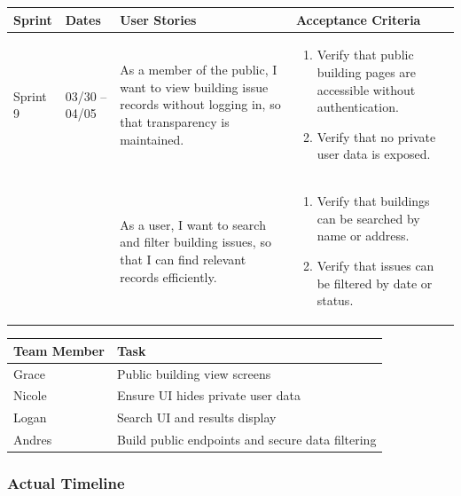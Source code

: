\documentclass[12pt]{article}
\begin{document}
\noindent
\begin{tabular}{|L{1.2cm}|L{1.8cm}|L{5.2cm}|L{6.3cm}|}
\hline
\textbf{Sprint} & \textbf{Dates} & \textbf{User Stories} & \textbf{Acceptance Criteria} \\
\hline
Sprint 9 & 03/30 -- 04/05 &
As a member of the public, I want to view building issue records without logging in, so that transparency is maintained. &
\begin{enumerate}
    \item Verify that public building pages are accessible without authentication.
    \item Verify that no private user data is exposed.
\end{enumerate} \\
& &
As a user, I want to search and filter building issues, so that I can find relevant records efficiently. &
\begin{enumerate}
    \item Verify that buildings can be searched by name or address.
    \item Verify that issues can be filtered by date or status.
\end{enumerate} \\
\hline
\end{tabular}

\vspace{0.5em}

\noindent
\begin{tabular}{|L{2.5cm}|L{12.5cm}|}
\hline
\textbf{Team Member} & \textbf{Task} \\
\hline
Grace & Public building view screens \\
\hline
Nicole & Ensure UI hides private user data \\
\hline
Logan & Search UI and results display \\
\hline
Andres & Build public endpoints and secure data filtering \\
\hline
\end{tabular}

\vspace{0.5em}
\subsubsection{Actual Timeline}

\vspace{0.5em}
\end{document}
